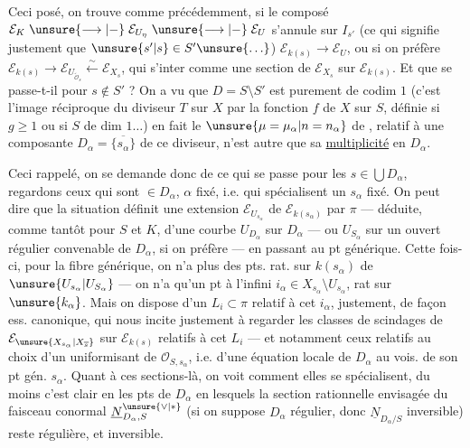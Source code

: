 Ceci posé, on trouve comme précédemment, si le composé  $\mathcal E_K\mathrel{\unsure{\longrightarrow|-}}\mathcal E_{U_\eta}\mathrel{\unsure{\longrightarrow|-}}\mathcal E_U$ s'annule sur $I_{s'}$   (ce qui signifie justement que $\unsure{s'|s}\in S'\unsure{\ldots}$)   $\mathcal E_{k(s)}\longrightarrow\mathcal E_U$, ou si on préfère $\mathcal E_{k(s)}\longrightarrow\mathcal E_{U_{\widetilde{\mathcal O}_s}}\xleftarrow{\sim}\mathcal E_{X_s}$, qui   s'inter comme une section de $\mathcal E_{X_s}$ sur $\mathcal E_{k(s)}$. Et que se passe-t-il pour $s\notin S'$ ?  On a vu que $D=S\setminus S'$ est purement de codim $1$ (c'est l'image réciproque du diviseur $T$ sur $X$ par la fonction $f$ de $X$ sur $S$, définie si $g\geq1$ ou si $S$ de dim $1\ldots$) en fait le $\unsure{\mu=\mu_\alpha|n=n_\alpha}$ de , relatif à
une composante $D_\alpha=\overline{\{s_\alpha\}}$ de ce diviseur, n'est autre que sa \uline{multiplicité} en $D_\alpha$.

Ceci rappelé, on se demande donc de ce qui se passe pour les $s\in\bigcup D_\alpha$,    regardons ceux qui sont $\in D_\alpha$, $\alpha$ fixé, i.e. qui spécialisent un $s_\alpha$ fixé. On peut dire que la situation définit une extension $\mathcal E_{U_{s_\alpha}}$ de $\mathcal E_{k(s_\alpha)}$ par $\pi$ --- déduite, comme tantôt pour $S$ et $K$, d'une courbe  $U_{D_\alpha}$ sur $D_\alpha$ --- ou $U_{S_\alpha}$ sur un ouvert régulier convenable de $D_\alpha$, si on préfère --- en passant au pt générique. Cette fois-ci, pour la fibre générique, on n'a plus des  pts. rat. sur $k(s_\alpha)$ de $\unsure{U_{s_\alpha}|U_{S_\alpha}}$ --- on n'a qu'un pt à l'infini $i_\alpha\in X_{s_\alpha}\setminus U_{s_\alpha}$, rat sur $\unsure{k_\alpha}$. Mais on dispose  d'un $L_i\subset\pi$ relatif à cet $i_\alpha$, justement, de façon ess. canonique,
qui nous incite justement à regarder les classes de scindages de $\mathcal E_{\unsure{X_{s_\alpha}|X_{\overline s}}}$ sur $\mathcal E_{k(s)}$ relatifs à cet $L_i$ --- et notamment ceux relatifs au choix d'un uniformisant de $\mathcal O_{S,s_\alpha}$, i.e. d'une équation locale de $D_\alpha$ au vois. de son pt gén. $s_\alpha$.   Quant à ces sections-là, on voit comment elles se spécialisent, du moins c'est clair en les pts de $D_\alpha$ en lesquels la section rationnelle envisagée du faisceau conormal $\underline N_{D_\alpha,S}^{\unsure{\vee|*}}$ (si on suppose $D_\alpha$ régulier,  donc $\underline N_{D_\alpha/S}$ inversible) reste régulière, et inversible.

